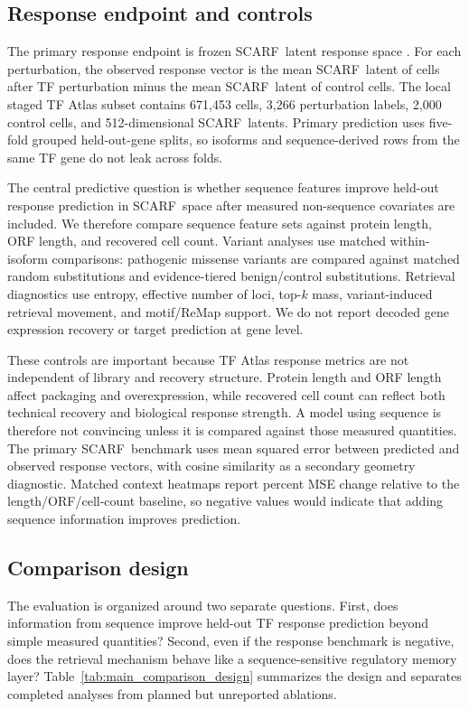\documentclass{article}
\newcommand{\scarf}{\textsc{SCARF}}
\begin{document}
\subsection{Response endpoint and controls}

The primary response endpoint is frozen \scarf\ latent response space \citep{scarf2025}. For each perturbation, the observed response vector is the mean \scarf\ latent of cells after TF perturbation minus the mean \scarf\ latent of control cells. The local staged TF Atlas subset contains 671,453 cells, 3,266 perturbation labels, 2,000 control cells, and 512-dimensional \scarf\ latents. Primary prediction uses five-fold grouped held-out-gene splits, so isoforms and sequence-derived rows from the same TF gene do not leak across folds.

The central predictive question is whether sequence features improve held-out response prediction in \scarf\ space after measured non-sequence covariates are included. We therefore compare sequence feature sets against protein length, ORF length, and recovered cell count. Variant analyses use matched within-isoform comparisons: pathogenic missense variants are compared against matched random substitutions and evidence-tiered benign/control substitutions. Retrieval diagnostics use entropy, effective number of loci, top-\(k\) mass, variant-induced retrieval movement, and motif/ReMap support. We do not report decoded gene expression recovery or target prediction at gene level.

These controls are important because TF Atlas response metrics are not independent of library and recovery structure. Protein length and ORF length affect packaging and overexpression, while recovered cell count can reflect both technical recovery and biological response strength. A model using sequence is therefore not convincing unless it is compared against those measured quantities. The primary \scarf\ benchmark uses mean squared error between predicted and observed response vectors, with cosine similarity as a secondary geometry diagnostic. Matched context heatmaps report percent MSE change relative to the length/ORF/cell-count baseline, so negative values would indicate that adding sequence information improves prediction.

\subsection{Comparison design}

The evaluation is organized around two separate questions. First, does information from sequence improve held-out TF response prediction beyond simple measured quantities? Second, even if the response benchmark is negative, does the retrieval mechanism behave like a sequence-sensitive regulatory memory layer? Table~\ref{tab:main_comparison_design} summarizes the design and separates completed analyses from planned but unreported ablations.
\end{document}
